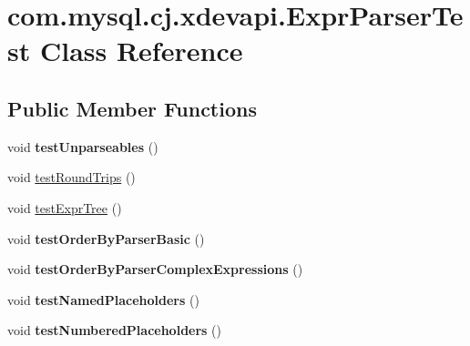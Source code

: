 \hypertarget{classcom_1_1mysql_1_1cj_1_1xdevapi_1_1_expr_parser_test}{}\section{com.\+mysql.\+cj.\+xdevapi.\+Expr\+Parser\+Test Class Reference}
\label{classcom_1_1mysql_1_1cj_1_1xdevapi_1_1_expr_parser_test}
\subsection*{Public Member Functions}
\begin{DoxyCompactItemize}
\item 
\mbox{\label{classcom_1_1mysql_1_1cj_1_1xdevapi_1_1_expr_parser_test_a91754eb54215bd502255a907664a6f21}} 
void {\bfseries test\+Unparseables} ()
\item 
void \mbox{\hyperlink{classcom_1_1mysql_1_1cj_1_1xdevapi_1_1_expr_parser_test_a472616b8dbef32e1fb26aa421ea037dd}{test\+Round\+Trips}} ()
\item 
void \mbox{\hyperlink{classcom_1_1mysql_1_1cj_1_1xdevapi_1_1_expr_parser_test_a7e69cddec256b6dc69fb737e56161272}{test\+Expr\+Tree}} ()
\item 
\mbox{\label{classcom_1_1mysql_1_1cj_1_1xdevapi_1_1_expr_parser_test_a170332f113cd69d799199fd7a77d3c51}} 
void {\bfseries test\+Order\+By\+Parser\+Basic} ()
\item 
\mbox{\label{classcom_1_1mysql_1_1cj_1_1xdevapi_1_1_expr_parser_test_a11634b14b8d2f068b79e880f7b4f4c90}} 
void {\bfseries test\+Order\+By\+Parser\+Complex\+Expressions} ()
\item 
\mbox{\label{classcom_1_1mysql_1_1cj_1_1xdevapi_1_1_expr_parser_test_ad33c986dc9b34bc0cfbdf922712c5a97}} 
void {\bfseries test\+Named\+Placeholders} ()
\item 
\mbox{\label{classcom_1_1mysql_1_1cj_1_1xdevapi_1_1_expr_parser_test_a4e557d858128896157b3c2b1d704ab9f}} 
void {\bfseries test\+Numbered\+Placeholders} ()

\end{DoxyCompactItemize}
